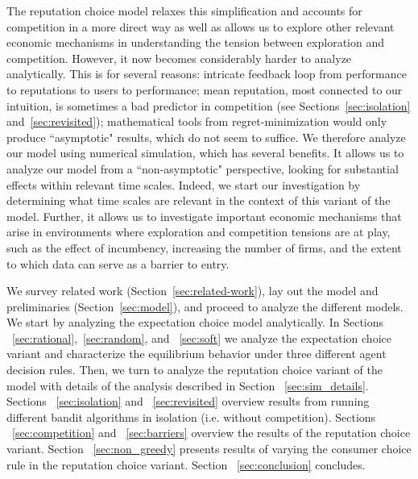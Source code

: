 The reputation choice model relaxes this simplification and accounts for competition in a more direct way as well as allows us to explore other relevant economic mechanisms in understanding the tension between exploration and competition. However, it now becomes considerably harder to analyze analytically. This is for several reasons: intricate feedback loop from performance to reputations to users to performance;
%
mean reputation, most connected to our intuition, is sometimes a bad predictor in competition (see Sections~\ref{sec:isolation} and~\ref{sec:revisited});
%
mathematical tools from regret-minimization would only produce ``asymptotic" results, which do not seem to suffice. We therefore analyze our model using numerical simulation, which has several benefits. It allows us to analyze our model from a ``non-asymptotic" perspective, looking for substantial effects within relevant time scales. Indeed, we start our investigation by determining what time scales are relevant in the context of this variant of the model. Further, it allows us to investigate important economic mechanisms that arise in environments where exploration and competition tensions are at play, such as the effect of incumbency, increasing the number of firms, and the extent to which data can serve as a barrier to entry.

We survey related work (Section~\ref{sec:related-work}), lay out the model and preliminaries (Section~\ref{sec:model}), and proceed to analyze the different models. We start by analyzing the expectation choice model analytically. In Sections ~\ref{sec:rational},~\ref{sec:random}, and ~\ref{sec:soft} we analyze the expectation choice variant and characterize the equilibrium behavior under three different agent decision rules. Then, we turn to analyze the reputation choice variant of the model with details of the analysis described in Section ~\ref{sec:sim_details}. Sections ~\ref{sec:isolation} and ~\ref{sec:revisited} overview results from running different bandit algorithms in isolation (i.e. without competition). Sections ~\ref{sec:competition} and ~\ref{sec:barriers} overview the results of the reputation choice variant. Section ~\ref{sec:non_greedy} presents results of varying the consumer choice rule in the reputation choice variant. Section ~\ref{sec:conclusion} concludes.


